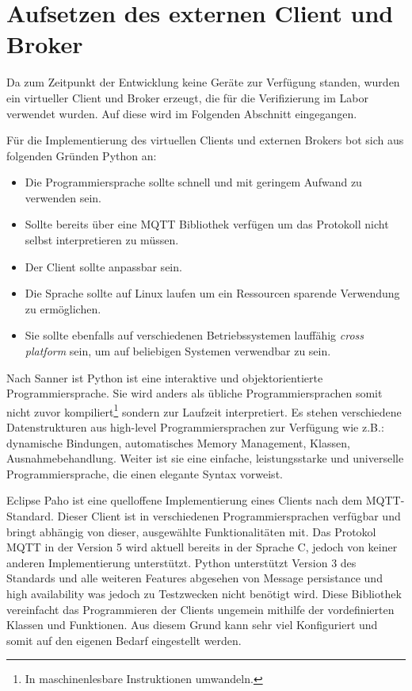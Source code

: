\section{Aufsetzen des externen Client und Broker}
    Da zum Zeitpunkt der Entwicklung keine Geräte zur Verfügung standen, wurden ein virtueller Client und Broker erzeugt, die für die Verifizierung im Labor verwendet wurden.
    Auf diese wird im Folgenden Abschnitt eingegangen.

    Für die Implementierung des virtuellen Clients und externen Brokers bot sich aus folgenden Gründen Python an:
    \begin{itemize}
        \item Die Programmiersprache sollte schnell und mit geringem Aufwand zu verwenden sein.
        \item Sollte bereits über eine \ac{MQTT} Bibliothek verfügen um das Protokoll nicht selbst interpretieren zu müssen.
        \item Der Client sollte anpassbar sein.
        \item Die Sprache sollte auf Linux laufen um ein Ressourcen sparende Verwendung zu ermöglichen.
        \item Sie sollte ebenfalls auf verschiedenen Betriebssystemen lauffähig \emph{cross platform} sein, um auf beliebigen Systemen verwendbar zu sein.
    \end{itemize}
    Nach Sanner ist Python ist eine interaktive und objektorientierte Programmiersprache. Sie wird anders als übliche Programmiersprachen somit nicht zuvor kompiliert\footnote{In maschinenlesbare Instruktionen umwandeln.} sondern zur Laufzeit interpretiert.
    Es stehen verschiedene Datenstrukturen aus high-level Programmiersprachen zur Verfügung wie z.B.: dynamische Bindungen, automatisches Memory Management, Klassen, Ausnahmebehandlung. Weiter ist sie eine einfache, leistungsstarke und universelle Programmiersprache, die einen elegante Syntax vorweist. \cite{sanner1999python}
        
    Eclipse Paho ist eine quelloffene Implementierung eines Clients nach dem \ac{MQTT}-Standard. Dieser Client ist in verschiedenen Programmiersprachen verfügbar und bringt abhängig von dieser, ausgewählte Funktionalitäten mit.
    Das Protokol \ac{MQTT} in der Version 5 wird aktuell bereits in der Sprache C, jedoch von keiner anderen Implementierung unterstützt. Python unterstützt Version 3 des Standards und alle weiteren Features abgesehen von \glqq Message persistance\grqq{} und \glqq high availability\grqq{} was jedoch zu Testzwecken nicht benötigt wird. \cite{eclipse_foundation2017}
    Diese Bibliothek vereinfacht das Programmieren der Clients ungemein mithilfe der vordefinierten Klassen und Funktionen.
    Aus diesem Grund kann sehr viel Konfiguriert und somit auf den eigenen Bedarf eingestellt werden. 

